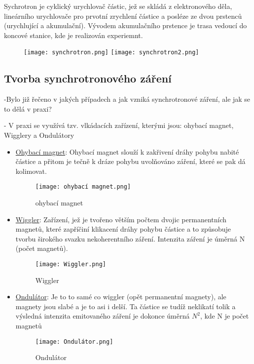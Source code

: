 Sychrotron je cyklický urychlovač částic, jež se skládá z elektronového děla, lineárního urychlovače pro prvotní zrychlení částice a posléze ze dvou prstenců (urychlující a akumulační). Vývodem akumulačního prstence je trasa vedoucí do koncové stanice, kde je realizován experiemnt.

\begin{figure}[ht!]
	\texttt{[image: synchrotron.png]}
	\texttt{[image: synchrotron2.png]}
\end{figure}

\subsection{Tvorba synchrotronového záření}

-Bylo již řečeno v jakých případech a jak vzniká synchrotronové záření, ale jak se to dělá v praxi?

- V praxi se využívá tzv. vlkádacích zařízení, kterými jsou: ohybací magnet, Wigglery a Ondulátory

\begin{itemize}
    \item \underline{Ohybací magnet}: Ohybací magnet slouží k zakřivení dráhy pohybu nabité částice a přitom je tečně k dráze pohybu uvolňováno záření, které se pak dá kolimovat.

    \begin{figure}[ht!]
        \centering
        \texttt{[image: ohybací magnet.png]}
        \caption{ohybací magnet}
    \end{figure}
    \item \underline{Wiggler}: Zařízení, jež je tvořeno větším počtem dvojic permanentních magnetů, které zapříčiní klikacení dráhy pohybu částice a to způsobuje tvorbu širokého svazku nekoherentního záření. Intenzita záření je úměrná N (počet magnetů).

    \begin{figure}[ht!]
        \centering
        \texttt{[image: Wiggler.png]}
        \caption{Wiggler}
    \end{figure}
        
    \item \underline{Ondulátor}: Je to to samé co wiggler (opět permanentní magnety), ale magnety jsou slabé a je to asi i delší. Ta částice se tudíž neklikatí tolik a výsledná intenzita emitovaného záření je dokonce úměrná $N^2$, kde N je počet magnetů

    \begin{figure}[ht!]
        \centering
        \texttt{[image: Ondulátor.png]}
        \caption{Ondulátor}
    \end{figure}
    
\end{itemize}


